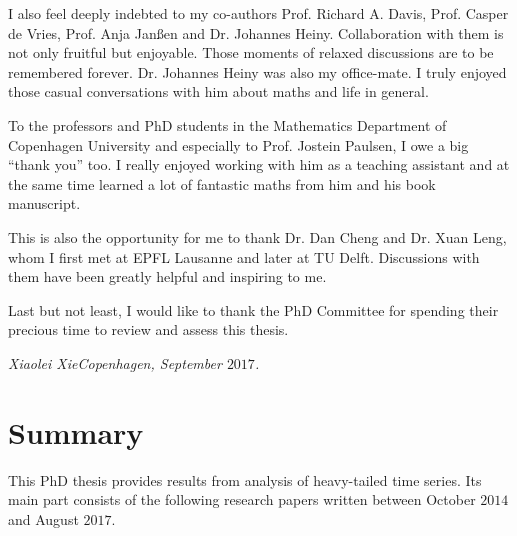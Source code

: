 I also feel deeply indebted to my co-authors Prof. Richard A. Davis,
Prof. Casper de Vries, Prof. Anja Jan\ss en and Dr. Johannes Heiny.
Collaboration with them is not only fruitful but enjoyable. Those moments
of relaxed discussions are to be remembered forever. Dr. Johannes Heiny
was also my office-mate. I truly enjoyed those casual conversations
with him about maths and life in general.

To the professors and PhD students in the Mathematics Department of
Copenhagen University and especially to Prof. Jostein Paulsen, I owe a
big ``thank you'' too. I really enjoyed working with him as a teaching
assistant and at the same time learned a lot of fantastic maths from him
and his book manuscript.

This is also the opportunity for me to thank Dr. Dan Cheng and
Dr. Xuan Leng, whom I first met at EPFL Lausanne and later at TU Delft.
Discussions with them have been greatly helpful and inspiring to me.

Last but not least, I would like to thank the PhD Committee for spending
their precious time to review and assess this thesis.
\bigskip


{\em Xiaolei Xie\qquad \qquad \qquad \qquad \qquad Copenhagen, September $2017$.}


\chapter*{Summary}
This PhD thesis provides results from analysis of heavy-tailed time
series. Its main part consists of the following research papers
written between October $2014$ and August $2017$.

